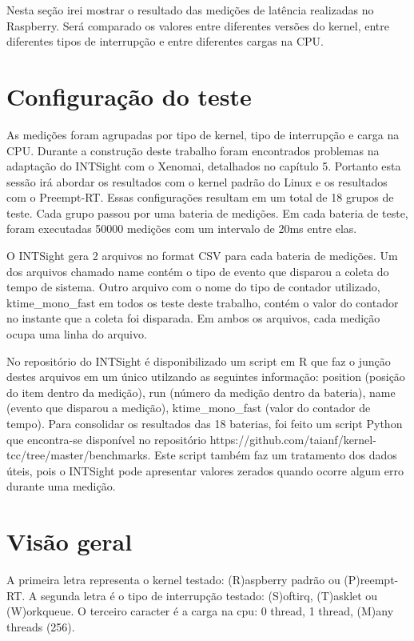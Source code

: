 
Nesta seção irei mostrar o resultado das medições de latência realizadas no Raspberry. Será comparado os valores entre diferentes versões do kernel, entre diferentes tipos de interrupção e entre diferentes cargas na CPU.

\section{Configuração do teste}

As medições foram agrupadas por tipo de kernel, tipo de interrupção e carga na CPU. Durante a construção deste trabalho foram encontrados problemas na adaptação do INTSight com o Xenomai, detalhados no capítulo 5. Portanto esta sessão irá abordar os resultados com o kernel padrão do Linux e os resultados com o Preempt-RT. Essas configurações resultam em um total de 18 grupos de teste. Cada grupo passou por uma bateria de medições. Em cada bateria de teste, foram executadas 50000 medições com um intervalo de 20ms entre elas. 

O INTSight gera 2 arquivos no format CSV para cada bateria de medições. Um dos arquivos chamado name contém o tipo de evento que disparou a coleta do tempo de sistema. Outro arquivo com o nome do tipo de contador utilizado, ktime\_mono\_fast em todos os teste deste trabalho, contém o valor do contador no instante que a coleta foi disparada. Em ambos os arquivos, cada medição ocupa uma linha do arquivo.

No repositório do INTSight é disponibilizado um script em R que faz o junção destes arquivos em um único utilzando as seguintes informação: position (posição do item dentro da medição), run (número da medição dentro da bateria), name (evento que disparou a medição), ktime\_mono\_fast (valor do contador de tempo). Para consolidar os resultados das 18 baterias, foi feito um script Python que encontra-se disponível no repositório https://github.com/taianf/kernel-tcc/tree/master/benchmarks. Este script também faz um tratamento dos dados úteis, pois o INTSight pode apresentar valores zerados quando ocorre algum erro durante uma medição.

\section{Visão geral}

A primeira letra representa o kernel testado: (R)aspberry padrão ou (P)reempt-RT.
A segunda letra é o tipo de interrupção testado: (S)oftirq, (T)asklet ou (W)orkqueue.
O terceiro caracter é a carga na cpu: 0 thread, 1 thread, (M)any threads (256).

